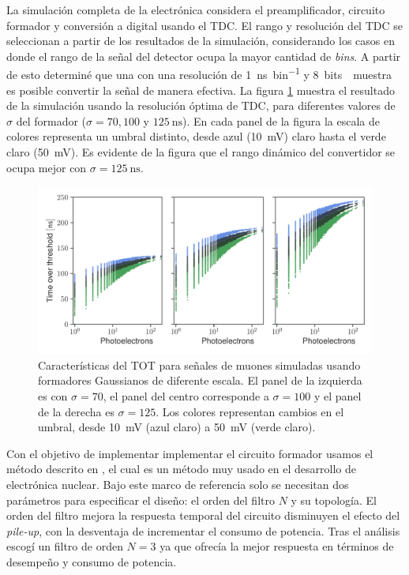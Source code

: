 La simulación completa de la electrónica considera el preamplificador, circuito formador y conversión a digital usando el TDC. El rango y resolución del TDC se seleccionan a partir de los resultados de la simulación, considerando los casos en donde el rango de la señal del detector ocupa la mayor cantidad de \emph{bins}. A partir de esto determiné que una con una resolución de \SI{1}{\ns\per bin} y \SI{8}{bits \per muestra} es posible convertir la señal de manera efectiva. La figura \ref{fig:tot-sigma} muestra el resultado de la simulación usando la resolución óptima de TDC, para diferentes valores de $\sigma$ del formador ($\sigma=70,100$ y $\SI{125}{\ns}$). En cada panel de la figura la escala de colores representa un umbral distinto, desde azul (\SI{10}{\milli\volt}) claro hasta el verde claro (\SI{50}{\milli\volt}). Es evidente de la figura que el rango dinámico del convertidor se ocupa mejor con $\sigma=\SI{125}{\ns}$.

\begin{figure}
        \centering
        \includegraphics[width=\textwidth]{tot_d30par.pdf}
        \caption{Características del TOT para señales de muones simuladas usando formadores Gaussianos de diferente escala. El panel de la izquierda es con $\sigma=70$, el panel del centro corresponde a $\sigma=100$ y el panel de la derecha es $\sigma=125$. Los colores representan cambios en el umbral, desde \SI{10}{\milli\volt} (azul claro) a \SI{50}{\milli\volt} (verde claro).}
        \label{fig:tot-sigma}
\end{figure}

Con el objetivo de implementar implementar el circuito formador usamos el método descrito en \cite{ohkawa76}, el cual es un método muy usado en el desarrollo de electrónica nuclear. Bajo este marco de referencia solo se necesitan dos parámetros para especificar el diseño: el orden del filtro $N$ y su topología. El orden del filtro mejora la respuesta temporal del circuito disminuyen el efecto del \emph{pile-up}, con la desventaja de incrementar el consumo de potencia. Tras el análisis escogí un filtro de orden $N=3$ ya que ofrecía la mejor respuesta en términos de desempeño y consumo de potencia.

